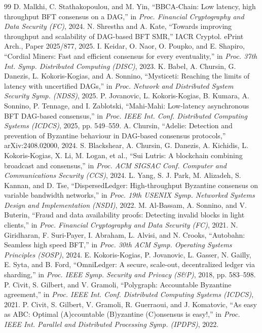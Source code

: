 \documentclass[UTF8,fontset=windows,a4paper,11pt]{ctexart}
\begin{document}
\begin{thebibliography}{99}
 D. Malkhi, C. Stathakopoulou, and M. Yin, “BBCA-Chain: Low latency, high throughput BFT consensus on a DAG,” in \textit{Proc. Financial Cryptography and Data Security (FC)}, 2024.
 N. Shrestha and A. Kate, “Towards improving throughput and scalability of DAG-based BFT SMR,” IACR Cryptol. ePrint Arch., Paper 2025/877, 2025.
 I. Keidar, O. Naor, O. Poupko, and E. Shapiro, “Cordial Miners: Fast and efficient consensus for every eventuality,” in \textit{Proc. 37th Int. Symp. Distributed Computing (DISC)}, 2023.
 K. Babel, A. Chursin, G. Danezis, L. Kokoris-Kogias, and A. Sonnino, “Mysticeti: Reaching the limits of latency with uncertified DAGs,” in \textit{Proc. Network and Distributed System Security Symp. (NDSS)}, 2025.
 P. Jovanovic, L. Kokoris-Kogias, B. Kumara, A. Sonnino, P. Tennage, and I. Zablotski, “Mahi-Mahi: Low-latency asynchronous BFT DAG-based consensus,” in \textit{Proc. IEEE Int. Conf. Distributed Computing Systems (ICDCS)}, 2025, pp. 549–559.
 A. Chursin, “Adelie: Detection and prevention of Byzantine behaviour in DAG-based consensus protocols,” arXiv:2408.02000, 2024.
 S. Blackshear, A. Chursin, G. Danezis, A. Kichidis, L. Kokoris-Kogias, X. Li, M. Logan, et al., “Sui Lutris: A blockchain combining broadcast and consensus,” in \textit{Proc. ACM SIGSAC Conf. Computer and Communications Security (CCS)}, 2024.
 L. Yang, S. J. Park, M. Alizadeh, S. Kannan, and D. Tse, “DispersedLedger: High-throughput Byzantine consensus on variable bandwidth networks,” in \textit{Proc. 19th USENIX Symp. Networked Systems Design and Implementation (NSDI)}, 2022.
 M. Al-Bassam, A. Sonnino, and V. Buterin, “Fraud and data availability proofs: Detecting invalid blocks in light clients,” in \textit{Proc. Financial Cryptography and Data Security (FC)}, 2021.
 N. Giridharan, F. Suri-Payer, I. Abraham, L. Alvisi, and N. Crooks, “Autobahn: Seamless high speed BFT,” in \textit{Proc. 30th ACM Symp. Operating Systems Principles (SOSP)}, 2024.
 E. Kokoris-Kogias, P. Jovanovic, L. Gasser, N. Gailly, E. Syta, and B. Ford, “OmniLedger: A secure, scale-out, decentralized ledger via sharding,” in \textit{Proc. IEEE Symp. Security and Privacy (S\&P)}, 2018, pp. 583–598.
 P. Civit, S. Gilbert, and V. Gramoli, “Polygraph: Accountable Byzantine agreement,” in \textit{Proc. IEEE Int. Conf. Distributed Computing Systems (ICDCS)}, 2021.
 P. Civit, S. Gilbert, V. Gramoli, R. Guerraoui, and J. Komatovic, “As easy as ABC: Optimal (A)ccountable (B)yzantine (C)onsensus is easy!,” in \textit{Proc. IEEE Int. Parallel and Distributed Processing Symp. (IPDPS)}, 2022.

\end{thebibliography}
\end{document}
